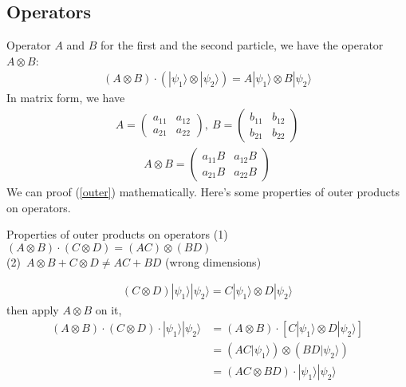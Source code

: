 \documentclass[UTF8,12pt]{article} %
\makeatletter
\newenvironment{proof}[1][\protect\proofname]{\par
\normalfont\topsep6\p@\@plus6\p@\relax
\trivlist
\itemindent\parindent
\item[\hskip\labelsep
\scshape
#1]\ignorespaces
}{%
\endtrivlist\@endpefalse
}
\renewcommand{\proofname}{\it{Solution}}
\makeatother
\begin{document}
\subsection{Operators}
Operator $A$ and $B$ for the first and the second particle, we have the operator $A\otimes B$:
\begin{align}\label{outer}
\left(A\otimes B\right)\cdot \left(|\psi_1\rangle\otimes|\psi_2\rangle\right) = A|\psi_1\rangle\otimes B|\psi_2\rangle
\end{align}
In matrix form, we have 
\begin{align}
A = \begin{pmatrix}a_{11} & a_{12}\\a_{21} & a_{22}\end{pmatrix},~ B = \begin{pmatrix}b_{11}&b_{12}\\b_{21}&b_{22}\end{pmatrix}
\end{align}
\begin{align}
A\otimes B = \begin{pmatrix}a_{11}B&a_{12}B\\a_{21}B&a_{22}B\end{pmatrix}
\end{align}
We can proof (\ref{outer}) mathematically. Here's some properties of outer products on operators.
\begin{myboxes}{Properties of outer products on operators}{}
(1)~$\left(A\otimes B\right)\cdot\left(C\otimes D\right) = (AC)\otimes (BD)$\\
(2)~$A\otimes B + C\otimes D \ne AC + BD$ (wrong dimensions)
\end{myboxes}
\begin{proof}[Proof]
\begin{align}
(C\otimes D)|\psi_1\rangle|\psi_2\rangle = C|\psi_{1}\rangle\otimes D|\psi_{2}\rangle
\end{align}
then apply $A\otimes B$ on it,
\begin{align}
\left(A\otimes B\right)\cdot\left(C\otimes D\right)\cdot|\psi_1\rangle|\psi_2\rangle &= \left(A\otimes B\right)\cdot \left[C|\psi_{1}\rangle\otimes D|\psi_{2}\rangle\right]\\
&= (AC|\psi_{1}\rangle)\otimes(BD|\psi_{2}\rangle)\\
&= (AC\otimes BD)\cdot|\psi_{1}\rangle|\psi_{2}\rangle
\end{align}
\end{proof}
\end{document}
